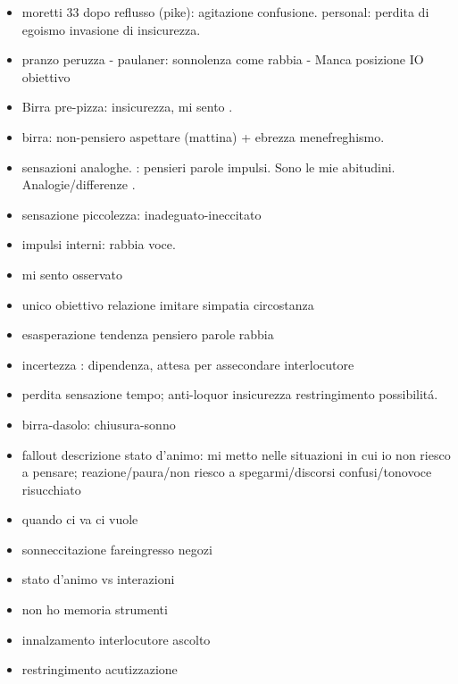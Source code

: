 \begin{itemize}

\item moretti 33 dopo reflusso (pike): agitazione confusione. personal: perdita di egoismo invasione di insicurezza.

\item pranzo peruzza - paulaner: sonnolenza  come rabbia - Manca posizione IO obiettivo

\item Birra pre-pizza:   insicurezza, mi sento .

\item birra: non-pensiero aspettare (mattina) + ebrezza menefreghismo. 

\item {} sensazioni analoghe. : pensieri parole impulsi. Sono le mie abitudini. Analogie/differenze .

\item sensazione piccolezza: inadeguato-ineccitato

\item impulsi interni: rabbia voce.

\item mi sento osservato

\item unico obiettivo relazione imitare simpatia circostanza

\item esasperazione tendenza pensiero parole rabbia

\item incertezza : dipendenza, attesa per assecondare interlocutore

\item perdita sensazione tempo; anti-loquor insicurezza restringimento possibilit\'a.

\item birra-dasolo: chiusura-sonno

\item fallout descrizione stato d'animo: mi metto nelle situazioni in cui io non riesco a pensare; reazione/paura/non riesco a spegarmi/discorsi confusi/tonovoce risucchiato

\item quando ci va ci vuole

\item sonneccitazione fareingresso negozi

\item stato d'animo vs interazioni

\item non ho memoria strumenti

\item innalzamento interlocutore ascolto

\item restringimento acutizzazione

\end{itemize}

